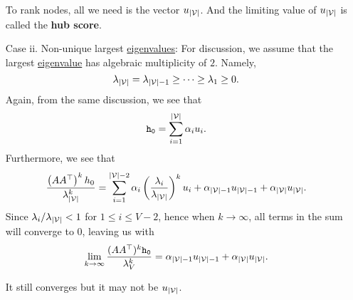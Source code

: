 \begin{enumerate}
		\begin{remark}
			To rank nodes, all we need is the vector \(u_{\left\vert \mathcal{\MakeUppercase{v}} \right\vert }\).
			And the limiting value of \(u_{\left\vert \mathcal{\MakeUppercase{v}} \right\vert }\) is called the \textbf{hub score}.
		\end{remark}
	\item[Case ii.] Non-unique largest \hyperref[def:eigenvalue]{eigenvalues}: For discussion, we assume that the largest \hyperref[def:eigenvalue]{eigenvalue} has algebraic multiplicity of \(2\). Namely,
		\[
			\lambda_{\left\vert \mathcal{\MakeUppercase{v}} \right\vert } = \lambda_{\left\vert \mathcal{\MakeUppercase{v}} \right\vert -1} \geq \cdots \geq \lambda_{1}\geq 0.
		\]
		Again, from the same discussion, we see that
		\[
			\mathtt{h_{0}} = \sum\limits_{i=1}^{\left\vert \mathcal{\MakeUppercase{v}} \right\vert } \alpha_{i}u_{i}.
		\]
		Furthermore, we see that
		\[
			\frac{\left(A A^{\top}\right)^k h_0}{\lambda_{\left\vert \mathcal{\MakeUppercase{v}} \right\vert }^k}
			= \sum\limits_{i=1}^{\left\vert \mathcal{\MakeUppercase{v}} \right\vert - 2} \alpha_{i}\left(\frac{\lambda_{i}}{\lambda_{\left\vert \mathcal{\MakeUppercase{v}} \right\vert }}\right)^k u_{i}
			+ \alpha_{\left\vert \mathcal{\MakeUppercase{v}} \right\vert -1}u_{\left\vert \mathcal{\MakeUppercase{v}} \right\vert -1}+\alpha_{\left\vert \mathcal{\MakeUppercase{v}} \right\vert } u_{\left\vert \mathcal{\MakeUppercase{v}} \right\vert }.
		\]
		Since \(\lambda_{i}/\lambda_{\left\vert \mathcal{\MakeUppercase{v}} \right\vert }< 1\) for \(1\leq i\leq V-2\), hence when \(k\to \infty \), all terms in the sum will converge to \(0\), leaving us with
		\[
			\lim_{k \to \infty} \frac{(A A^{\top})^{k}\mathtt{h_0}}{\lambda_V^k} = \alpha_{\left\vert \mathcal{\MakeUppercase{v}} \right\vert -1}u_{\left\vert \mathcal{\MakeUppercase{v}} \right\vert -1}
			+ \alpha_{\left\vert \mathcal{\MakeUppercase{v}} \right\vert } u_{\left\vert \mathcal{\MakeUppercase{v}} \right\vert }.
		\]
		\begin{remark}
			It still converges but it may not be \(u_{\left\vert \mathcal{\MakeUppercase{v}} \right\vert }\).
		\end{remark}
\end{enumerate}



